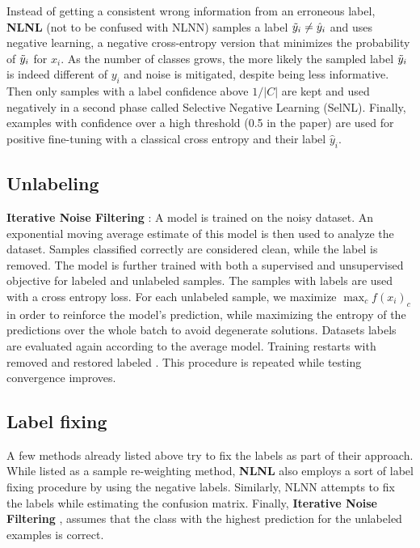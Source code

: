 Instead of getting a consistent wrong information from an erroneous label, \textbf{NLNL} \citep{NLNL} (not to be confused with NLNN) samples a label $\Tilde{y}_i \neq \hat{y}_i$ and uses negative learning, a negative cross-entropy version that minimizes the probability of $\Tilde{y}_i$ for $x_i$. As the number of classes grows, the more likely the sampled label $\Tilde{y}_i$ is indeed different of $y_i$ and noise is mitigated, despite being less informative. Then only samples with a label confidence above $1/|C|$ are kept and used negatively in a second phase called Selective Negative Learning (SelNL). Finally, examples with confidence over a high threshold (0.5 in the paper) are used for positive fine-tuning with a classical cross entropy and their label $\hat{y}_i$.

\subsection{Unlabeling}

\textbf{Iterative Noise Filtering} \citep{IterativeNoiseFiltering}:
A model is trained on the noisy dataset. An exponential moving average estimate of this model is then used to analyze the dataset. Samples classified correctly are considered clean, while the label is removed. The model is further trained with both a supervised and unsupervised objective for labeled and unlabeled samples. The samples with labels are used with a cross entropy loss. For each unlabeled sample, we maximize $\max_c f(x_i)_c$ in order to reinforce the model's prediction, while maximizing the entropy of the predictions over the whole batch to avoid degenerate solutions. Datasets labels are evaluated again according to the average model. Training restarts with removed and restored labeled %
. This procedure is repeated while testing convergence improves.

\subsection{Label fixing}

A few methods already listed above try to fix the labels as part of their approach. While listed as a sample re-weighting method, \textbf{NLNL} \citep{NLNL} also employs a sort of label fixing procedure by using the negative labels. Similarly, NLNN \citep{NLNN} attempts to fix the labels while estimating the confusion matrix. Finally, \textbf{Iterative Noise Filtering} \citep{IterativeNoiseFiltering}, assumes that the class with the highest prediction for the unlabeled examples is correct.

